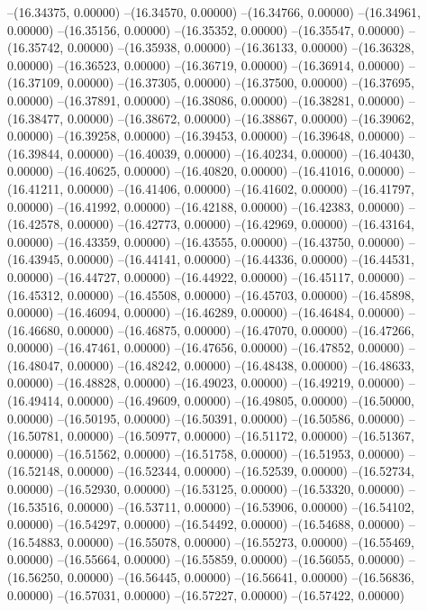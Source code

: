 --(16.34375, 0.00000)
--(16.34570, 0.00000)
--(16.34766, 0.00000)
--(16.34961, 0.00000)
--(16.35156, 0.00000)
--(16.35352, 0.00000)
--(16.35547, 0.00000)
--(16.35742, 0.00000)
--(16.35938, 0.00000)
--(16.36133, 0.00000)
--(16.36328, 0.00000)
--(16.36523, 0.00000)
--(16.36719, 0.00000)
--(16.36914, 0.00000)
--(16.37109, 0.00000)
--(16.37305, 0.00000)
--(16.37500, 0.00000)
--(16.37695, 0.00000)
--(16.37891, 0.00000)
--(16.38086, 0.00000)
--(16.38281, 0.00000)
--(16.38477, 0.00000)
--(16.38672, 0.00000)
--(16.38867, 0.00000)
--(16.39062, 0.00000)
--(16.39258, 0.00000)
--(16.39453, 0.00000)
--(16.39648, 0.00000)
--(16.39844, 0.00000)
--(16.40039, 0.00000)
--(16.40234, 0.00000)
--(16.40430, 0.00000)
--(16.40625, 0.00000)
--(16.40820, 0.00000)
--(16.41016, 0.00000)
--(16.41211, 0.00000)
--(16.41406, 0.00000)
--(16.41602, 0.00000)
--(16.41797, 0.00000)
--(16.41992, 0.00000)
--(16.42188, 0.00000)
--(16.42383, 0.00000)
--(16.42578, 0.00000)
--(16.42773, 0.00000)
--(16.42969, 0.00000)
--(16.43164, 0.00000)
--(16.43359, 0.00000)
--(16.43555, 0.00000)
--(16.43750, 0.00000)
--(16.43945, 0.00000)
--(16.44141, 0.00000)
--(16.44336, 0.00000)
--(16.44531, 0.00000)
--(16.44727, 0.00000)
--(16.44922, 0.00000)
--(16.45117, 0.00000)
--(16.45312, 0.00000)
--(16.45508, 0.00000)
--(16.45703, 0.00000)
--(16.45898, 0.00000)
--(16.46094, 0.00000)
--(16.46289, 0.00000)
--(16.46484, 0.00000)
--(16.46680, 0.00000)
--(16.46875, 0.00000)
--(16.47070, 0.00000)
--(16.47266, 0.00000)
--(16.47461, 0.00000)
--(16.47656, 0.00000)
--(16.47852, 0.00000)
--(16.48047, 0.00000)
--(16.48242, 0.00000)
--(16.48438, 0.00000)
--(16.48633, 0.00000)
--(16.48828, 0.00000)
--(16.49023, 0.00000)
--(16.49219, 0.00000)
--(16.49414, 0.00000)
--(16.49609, 0.00000)
--(16.49805, 0.00000)
--(16.50000, 0.00000)
--(16.50195, 0.00000)
--(16.50391, 0.00000)
--(16.50586, 0.00000)
--(16.50781, 0.00000)
--(16.50977, 0.00000)
--(16.51172, 0.00000)
--(16.51367, 0.00000)
--(16.51562, 0.00000)
--(16.51758, 0.00000)
--(16.51953, 0.00000)
--(16.52148, 0.00000)
--(16.52344, 0.00000)
--(16.52539, 0.00000)
--(16.52734, 0.00000)
--(16.52930, 0.00000)
--(16.53125, 0.00000)
--(16.53320, 0.00000)
--(16.53516, 0.00000)
--(16.53711, 0.00000)
--(16.53906, 0.00000)
--(16.54102, 0.00000)
--(16.54297, 0.00000)
--(16.54492, 0.00000)
--(16.54688, 0.00000)
--(16.54883, 0.00000)
--(16.55078, 0.00000)
--(16.55273, 0.00000)
--(16.55469, 0.00000)
--(16.55664, 0.00000)
--(16.55859, 0.00000)
--(16.56055, 0.00000)
--(16.56250, 0.00000)
--(16.56445, 0.00000)
--(16.56641, 0.00000)
--(16.56836, 0.00000)
--(16.57031, 0.00000)
--(16.57227, 0.00000)
--(16.57422, 0.00000)
